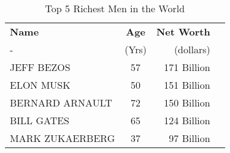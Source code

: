 \documentclass{article}
\begin{document}
	\begin{table}[h!]
		\begin{center}
			\caption{Top 5 Richest Men in the World}
			\label{tab:}
			\begin{tabular}{l|c|r|c}
				\textbf{Name} & \textbf{Age} & \textbf{Net Worth}\\
					- & (Yrs) & (dollars)\\
	                 \hline
	                 JEFF BEZOS & 57 & 171 Billion\\
	                 ELON MUSK & 50 & 151 Billion\\
	                 BERNARD ARNAULT & 72 & 150 Billion\\
	                 BILL GATES & 65 & 124 Billion\\
	                 MARK ZUKAERBERG & 37 & 97 Billion\\
	                \end{tabular}
		\end{center}
	\end{table}
\end{document}
